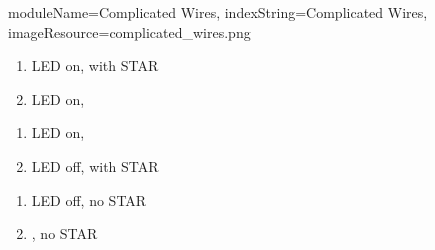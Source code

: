 \documentclass{../../ktane-mod}
\begin{document}
\begin{module}{
  moduleName=Complicated Wires,
  indexString=Complicated Wires,
  imageResource=complicated_wires.png
}
\begin{minipage}[t]{0.48\textwidth}
\begin{enumerate}
  \renewcommand{\labelenumi}{\alph{enumi}.}
  \item LED on,  with STAR
  \item LED on, \RED
\end{enumerate}
\end{minipage}
\hfill
\begin{minipage}[t]{0.48\textwidth}
\begin{enumerate}
  \renewcommand{\labelenumi}{\alph{enumi}.}
  \item LED on, \BLUE
  \item LED off, \PURPLE with STAR
\end{enumerate}

\vspace{0.5cm}

\begin{enumerate}
  \renewcommand{\labelenumi}{\alph{enumi}.}
  \setcounter{enumi}{2}
  \item LED off, no STAR
  \item \PURPLE, no STAR
\end{enumerate}
\end{minipage}

\vspace{1.5cm}

\begin{center}
\large{}
\end{center}


\end{module}
\end{document}
